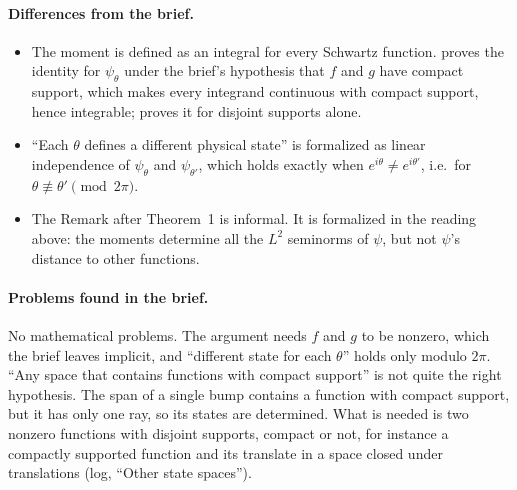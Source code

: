 \documentclass[11pt]{article}
\begin{document}
\paragraph{Differences from the brief.}
\begin{itemize}
\item The moment is defined as an integral for every Schwartz function.  proves
  the identity for $\psi_\theta$ under the brief's hypothesis that $f$ and $g$ have compact
  support, which makes every integrand continuous with compact support, hence integrable;
   proves it for disjoint supports alone.
\item ``Each $\theta$ defines a different physical state'' is formalized as linear
  independence of $\psi_\theta$ and $\psi_{\theta'}$, which holds exactly when
  $e^{i\theta} \ne e^{i\theta'}$, i.e.\ for $\theta \not\equiv \theta' \pmod{2\pi}$.
\item The Remark after Theorem~1 is informal. It is formalized in the reading above: the moments
  determine all the $L^2$ seminorms of $\psi$, but not $\psi$'s distance to other functions.
\end{itemize}

\paragraph{Problems found in the brief.} No mathematical problems. The argument needs $f$ and
$g$ to be nonzero, which the brief leaves implicit, and ``different state for each $\theta$''
holds only modulo $2\pi$. ``Any space that contains functions with compact support'' is not
quite the right hypothesis. The span of a single bump contains a function with compact support,
but it has only one ray, so its states are determined. What is needed is two nonzero functions
with disjoint supports, compact or not, for instance a compactly supported function and its
translate in a space closed under translations (log, ``Other state spaces'').
\end{document}
